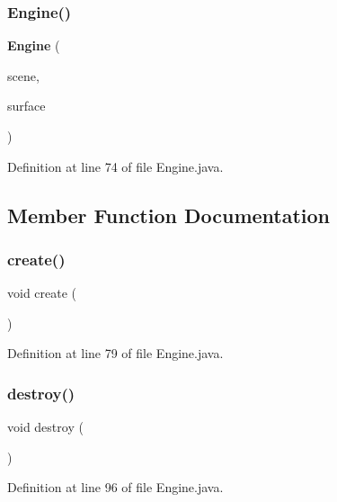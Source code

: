 \subsubsection{Engine()}
{\footnotesize\ttfamily \textbf{ Engine} (\begin{DoxyParamCaption}\item[{@Non\+Null \textbf{ Scene}}]{scene,  }\item[{@Non\+Null G\+L\+Surface\+View}]{surface }\end{DoxyParamCaption})}



Definition at line 74 of file Engine.\+java.



\subsection{Member Function Documentation}
\mbox{\label{classru_1_1litun_1_1unitingtwist_1_1_engine_ae2ee59f7cc16ee42559c87e81c433039}} 
\subsubsection{create()}
{\footnotesize\ttfamily void create (\begin{DoxyParamCaption}{ }\end{DoxyParamCaption})}



Definition at line 79 of file Engine.\+java.

\mbox{\label{classru_1_1litun_1_1unitingtwist_1_1_engine_a3a80b6032f86a56bec74609034b3246f}} 
\subsubsection{destroy()}
{\footnotesize\ttfamily void destroy (\begin{DoxyParamCaption}{ }\end{DoxyParamCaption})}



Definition at line 96 of file Engine.\+java.

